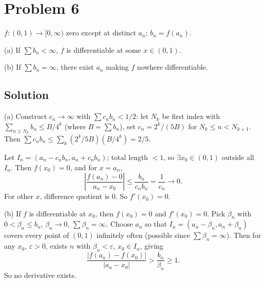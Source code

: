\documentclass{article}
\begin{document}
\section*{Problem 6}
$f:(0,1)\to[0,\infty)$ zero except at distinct $a_n$; $b_n=f(a_n)$.

(a) If $\sum b_n < \infty$, $f$ is differentiable at some $x\in(0,1)$.

(b) If $\sum b_n = \infty$, there exist $a_n$ making $f$ nowhere differentiable.

\subsection*{Solution}
(a) Construct $c_n\to\infty$ with $\sum c_n b_n < 1/2$: let $N_k$ be first index with $\sum_{n\ge N_k}b_n\le B/4^k$ (where $B=\sum b_n$), set $c_n = 2^k/(5B)$ for $N_k\le n<N_{k+1}$. Then $\sum c_n b_n\le \sum_k (2^k/5B)(B/4^k)=2/5$.

Let $I_n=(a_n - c_n b_n, a_n + c_n b_n)$; total length $<1$, so $\exists x_0\in(0,1)$ outside all $I_n$. Then $f(x_0)=0$, and for $x=a_n$,
\[\left|\frac{f(a_n)-0}{a_n-x_0}\right| \le \frac{b_n}{c_n b_n} = \frac{1}{c_n}\to 0.\]
For other $x$, difference quotient is $0$. So $f'(x_0)=0$.

(b) If $f$ is differentiable at $x_0$, then $f(x_0)=0$ and $f'(x_0)=0$. Pick $\beta_n$ with $0<\beta_n\le b_n$, $\beta_n\to 0$, $\sum\beta_n=\infty$. Choose $a_n$ so that $I_n=(a_n-\beta_n, a_n+\beta_n)$ covers every point of $(0,1)$ infinitely often (possible since $\sum\beta_n=\infty$). Then for any $x_0$, $\varepsilon>0$, exists $n$ with $\beta_n<\varepsilon$, $x_0\in I_n$, giving
\[\frac{|f(a_n)-f(x_0)|}{|a_n - x_0|} > \frac{b_n}{\beta_n} \ge 1.\]
So no derivative exists.
\end{document}
